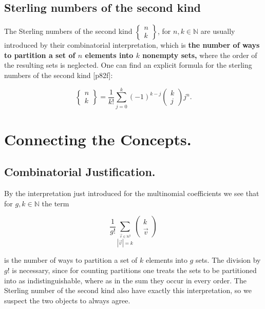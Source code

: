\documentclass{article}
\theoremstyle{theorem}
\theoremstyle{definition}
\begin{document}
\subsection{Sterling numbers of the second kind}
 
The Sterling numbers of the second kind \(\left\{ \begin{matrix} n\\k\end{matrix}\right\}\), for \(n,k\in\mathbb{N}\) are usually introduced by their combinatorial interpretation, which is \textbf{the number of ways to partition a set of \(n\) elements into \(k\)
nonempty sets, }where the order of the resulting sets is neglected. One can find an explicit formula for the sterling numbers of the second kind \cite{stanley2011enumerative}[p82f]:

\begin{equation}
\left\{\begin{matrix}n\\k\end{matrix}\right\} = \frac{1}{k!} \sum_{j=0}^k (-1)^{k-j} \begin{pmatrix}k\\j\end{pmatrix}j^n.
\end{equation}


\section{Connecting the Concepts.}

\subsection{Combinatorial Justification.} By the interpretation just introduced for the multinomial coefficients we see that for \(g,k\in\mathbb{N}\) the term

\begin{equation*}
\frac{1}{g!}\sum_{\stackrel{\vec{v}\in\mathbb{N}^g}{\left|\vec{v}\right|=k}} \begin{pmatrix} k \\ \vec{v} \end{pmatrix}
\end{equation*}

is the number of ways to partition a set of \(k\) elements into \(g\) sets. The division by \(g!\) is necessary, since for counting
partitions one treats the sets to be partitioned into as indistinguishable, where as in the sum they occur in every order.
The Sterling number of the second kind also have exactly this interpretation, so we suspect the two objects to always agree.
\end{document}
